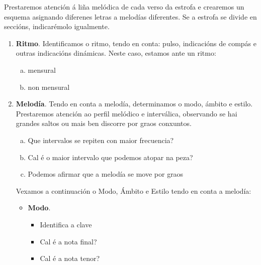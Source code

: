 \begin{multicols}{2}
Prestaremos atención á liña melódica de cada verso da estrofa e crearemos un esquema asignando diferenes letras a melodías diferentes.
Se a estrofa se divide en seccións, indicarémolo igualmente.
\par
\vspace*{0.3cm}
\newpage
%
    \begin{enumerate}[1.-]
        \item %
        \textbf{Ritmo}. Identificamos o ritmo, tendo en conta: pulso, indicacións de compás e outras indicacións dinámicas. 
        Neste caso, estamos ante un ritmo:
        \begin{enumerate}[a)]
            \item mensural 
            \item non mensural 
        \end{enumerate}
        \item %
        \textbf{Melodía}. Tendo en conta a melodía, determinamos o modo, ámbito e estilo. Prestaremos atención ao perfil melódico e interválica, observando se hai grandes saltos ou mais ben discorre por graos conxuntos.
        \begin{enumerate}[a)]
            \item 
            Que intervalos se repiten con maior frecuencia? \dotfill
            \item 
            Cal é o maior intervalo que podemos atopar na peza? \dotfill
            \item
            Podemos afirmar que a melodía se move por graos \dotfill
        \end{enumerate}
        Vexamos a continuación o Modo, Ámbito e Estilo tendo en conta a melodía:
        \begin{itemize}
            \item %
            \textbf{Modo}.
        \begin{itemize}            
            \item 
            Identifica a clave \dotfill
            \item 
            Cal é a nota final? \dotfill
            \item
            Cal é a nota tenor? \dotfill 

\end{itemize}
\end{itemize}
\end{enumerate}
\end{multicols}
